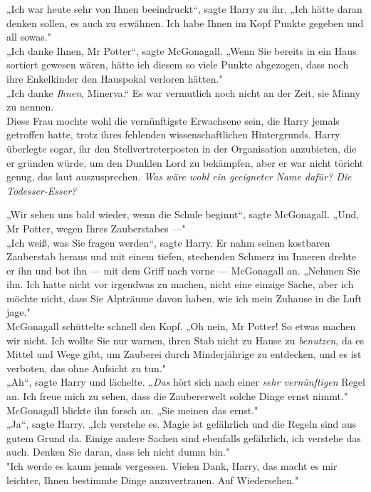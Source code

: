 {„Ich war heute sehr von Ihnen beeindruckt“, sagte Harry zu ihr. „Ich hätte daran denken sollen, es auch zu erwähnen. Ich habe Ihnen im Kopf Punkte gegeben und all sowas."\\ „Ich danke Ihnen, Mr Potter“, sagte McGonagall. „Wenn Sie bereits in ein Haus sortiert gewesen wären, hätte ich diesem so viele Punkte abgezogen, dass noch ihre Enkelkinder den Hauspokal verloren hätten."\\ „Ich danke \emph{Ihnen}, Minerva.“ Es war vermutlich noch nicht an der Zeit, sie Minny zu nennen.\\ Diese Frau mochte wohl die vernünftigste Erwachsene sein, die Harry jemals getroffen hatte, trotz ihres fehlenden wissenschaftlichen Hintergrunds. Harry überlegte sogar, ihr den Stellvertreterposten in der Organisation anzubieten, die er gründen würde, um den Dunklen Lord zu bekämpfen, aber er war nicht töricht genug, das laut auszusprechen. \emph{Was wäre wohl ein geeigneter Name dafür? Die Todesser-Esser?}

„Wir sehen uns bald wieder, wenn die Schule beginnt“, sagte McGonagall. „Und, Mr Potter, wegen Ihres Zauberstabes ---"\\ „Ich weiß, was Sie fragen werden“, sagte Harry. Er nahm seinen kostbaren Zauberstab heraus und mit einem tiefen, stechenden Schmerz im Inneren drehte er ihn und bot ihn --- mit dem Griff nach vorne --- McGonagall an. „Nehmen Sie ihn. Ich hatte nicht vor irgendwas zu machen, nicht eine einzige Sache, aber ich möchte nicht, dass Sie Alpträume davon haben, wie ich mein Zuhause in die Luft jage."\\ McGonagall schüttelte schnell den Kopf. „Oh nein, Mr Potter! So etwas machen wir nicht. Ich wollte Sie nur warnen, ihren Stab nicht zu Hause zu \emph{benutzen}, da es Mittel und Wege gibt, um Zauberei durch Minderjährige zu entdecken, und es ist verboten, das ohne Aufsicht zu tun."\\ „Ah“, sagte Harry und lächelte. „\emph{Das} hört sich nach einer \emph{sehr vernünftigen} Regel an. Ich freue mich zu sehen, dass die Zaubererwelt solche Dinge ernst nimmt."\\ McGonagall blickte ihn forsch an. „Sie meinen das ernst."\\ „Ja“, sagte Harry. „Ich verstehe es. Magie ist gefährlich und die Regeln sind aus gutem Grund da. Einige andere Sachen sind ebenfalls gefährlich, ich verstehe das auch. Denken Sie daran, dass ich nicht dumm bin."\\ "Ich werde es kaum jemals vergessen. Vielen Dank, Harry, das macht es mir leichter, Ihnen bestimmte Dinge anzuvertrauen. Auf Wiedersehen."

}
